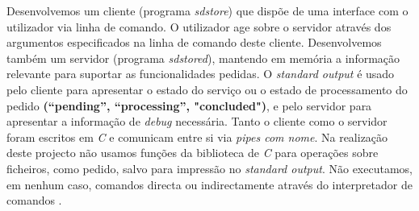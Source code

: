 \documentclass[11pt,a4paper]{report}
\begin{document}
    Desenvolvemos um cliente (programa \textit{sdstore}) que dispõe de uma interface com o utilizador via linha de comando. O utilizador age sobre o 	servidor através dos argumentos especificados na linha de comando deste cliente. Desenvolvemos também um servidor (programa 			\textit{sdstored}), mantendo em memória a informação relevante para suportar as funcionalidades pedidas.
    O \textit{standard output} é usado pelo cliente para apresentar o estado do serviço ou o estado de processamento do pedido
    \textbf{ (“pending”, “processing”, "concluded")}, e pelo servidor para apresentar a informação de \textit{debug}  necessária.
    Tanto o cliente como o servidor foram escritos em \textit{C} e comunicam entre si via \textit{pipes com nome}. Na realização deste 		projecto não usamos funções da biblioteca de \textit{C} para operações sobre ficheiros, como pedido, salvo para impressão no \textit{standard output}. 	 Não executamos, em nenhum caso, comandos directa ou indirectamente através do interpretador de comandos .
\end{document}

